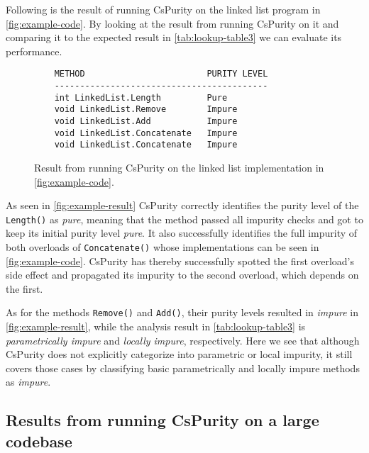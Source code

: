 \documentclass[a4paper,12pt]{article}
\begin{document}
Following is the result of running CsPurity on the linked list program in \autoref{fig:example-code}. By looking at the result from running CsPurity on it and comparing it to the expected result in \autoref{tab:lookup-table3} we can evaluate its performance.

\begin{figure}[htpb]
  \centering
  \begin{minipage}{\linewidth} %
    \begin{lstlisting}
    METHOD                        PURITY LEVEL
    ------------------------------------------
    int LinkedList.Length         Pure
    void LinkedList.Remove        Impure
    void LinkedList.Add           Impure
    void LinkedList.Concatenate   Impure
    void LinkedList.Concatenate   Impure
    \end{lstlisting}
  \end{minipage}
  \caption{Result from running CsPurity on the linked list implementation in \autoref{fig:example-code}.}
  \label{fig:example-result}
\end{figure}

As seen in \autoref{fig:example-result} CsPurity correctly identifies the purity level of the \texttt{Length()} as \textit{pure}, meaning that the method passed all impurity checks and got to keep its initial purity level \textit{pure}. It also successfully identifies the full impurity of both overloads of \texttt{Concatenate()} whose implementations can be seen in \autoref{fig:example-code}. CsPurity has thereby successfully spotted the first overload's side effect and propagated its impurity to the second overload, which depends on the first.

As for the methods \texttt{Remove()} and \texttt{Add()}, their purity levels resulted in \textit{impure} in \autoref{fig:example-result}, while the analysis result in \autoref{tab:lookup-table3} is \textit{parametrically impure} and \textit{locally impure}, respectively. Here we see that although CsPurity does not explicitly categorize into parametric or local impurity, it still covers those cases by classifying basic parametrically and locally impure methods as \textit{impure}.

\subsection{Results from running CsPurity on a large codebase} \label{sub:results-larger-codebase}
\end{document}
